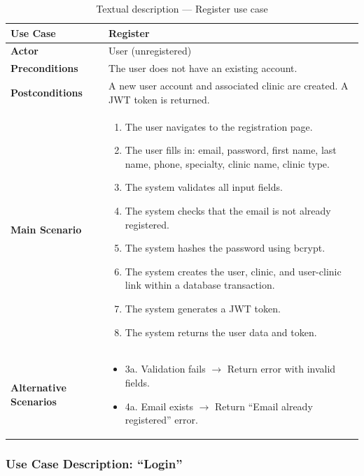 \documentclass[12pt,a4paper,oneside]{report}
\begin{document}
\begin{table}[H]
\centering
\caption{Textual description — Register use case}
\label{tab:uc_register}
\begin{tabular}{|p{3.5cm}|p{9.5cm}|}
\hline
\textbf{Use Case} & Register \\
\hline
\textbf{Actor} & User (unregistered) \\
\hline
\textbf{Preconditions} & The user does not have an existing account. \\
\hline
\textbf{Postconditions} & A new user account and associated clinic are created. A JWT token is returned. \\
\hline
\textbf{Main Scenario} &
\begin{enumerate}[leftmargin=*, nosep]
    \item The user navigates to the registration page.
    \item The user fills in: email, password, first name, last name, phone, specialty, clinic name, clinic type.
    \item The system validates all input fields.
    \item The system checks that the email is not already registered.
    \item The system hashes the password using bcrypt.
    \item The system creates the user, clinic, and user-clinic link within a database transaction.
    \item The system generates a JWT token.
    \item The system returns the user data and token.
\end{enumerate} \\
\hline
\textbf{Alternative Scenarios} &
\begin{itemize}[leftmargin=*, nosep]
    \item 3a. Validation fails $\rightarrow$ Return error with invalid fields.
    \item 4a. Email exists $\rightarrow$ Return ``Email already registered'' error.
\end{itemize} \\
\hline
\end{tabular}
\end{table}

\subsubsection{Use Case Description: ``Login''}
\end{document}
